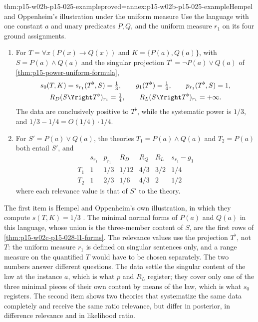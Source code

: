 \begin{hbtheorem}{thm:p15-w02b-p15-025-example}{proved=annex:p15-w02b-p15-025-example}{Hempel and Oppenheim's illustration under the uniform measure}
Use the language with one constant \(a\) and unary predicates \(P,Q\),
and the uniform measure \(r_1\) on its four ground assignments.
\begin{enumerate}
\item For \(T=\forall x(P(x)\to Q(x))\) and \(K=\{P(a),Q(a)\}\), with
\(S=P(a)\wedge Q(a)\) and the singular projection
\(T^\flat=\neg P(a)\vee Q(a)\) of \cref{thm:p15-power-uniform-formula},
\[
 \begin{gathered}
 s_0(T,K)=s_{r_1}(T^\flat,S)=\tfrac13,\qquad
 g_1(T^\flat)=\tfrac14,\qquad
 p_{r_1}(T^\flat,S)=1,\\
 R_D(S\Yright T^\flat)_{r_1}=\tfrac14,\qquad
 R_L(S\Yright T^\flat)_{r_1}=+\infty .
 \end{gathered}
\]
The data are conclusively positive to \(T^\flat\), while the systematic
power is \(1/3\), and \(1/3-1/4=O(1/4)\cdot1/4\).
\item For \(S'=P(a)\vee Q(a)\), the theories \(T_1=P(a)\wedge Q(a)\) and
\(T_2=P(a)\) both entail \(S'\), and
\[
 \begin{array}{c|cccccc}
  &s_{r_1}&p_{r_1}&R_D&R_Q&R_L&s_{r_1}-g_1\\\hline
 T_1&1&1/3&1/12&4/3&3/2&1/4\\
 T_2&1&2/3&1/6&4/3&2&1/2
 \end{array}
\]
where each relevance value is that of \(S'\) to the theory.
\end{enumerate}
\end{hbtheorem}

The first item is Hempel and Oppenheim's own illustration, in which they
compute \(s(T,K)=1/3\) \cite[p.~167]{HempelOppenheim1948Explanation}.
The minimal normal forms of \(P(a)\) and \(Q(a)\) in this language, whose
union is the three-member content of \(S\), are the first rows of
\cref{thm:p15-w02c-p15-028-l1-forms}.
The relevance values use the projection \(T^\flat\), not \(T\): the
uniform measure \(r_1\) is defined on singular sentences only, and a
range measure on the quantified \(T\) would have to be chosen
separately. The two numbers answer different questions. The data settle
the singular content of the law at the instance \(a\), which is what
\(p\) and \(R_L\) register; they cover only one of the three minimal
pieces of their own content by means of the law, which is what \(s_0\)
registers. The second item shows two theories that systematize the same
data completely and receive the same ratio relevance, but differ in
posterior, in difference relevance and in likelihood ratio.

